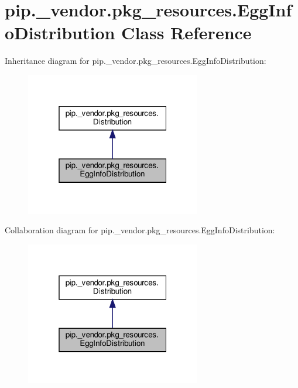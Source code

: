 \hypertarget{classpip_1_1__vendor_1_1pkg__resources_1_1EggInfoDistribution}{}\section{pip.\+\_\+vendor.\+pkg\+\_\+resources.\+Egg\+Info\+Distribution Class Reference}
\label{classpip_1_1__vendor_1_1pkg__resources_1_1EggInfoDistribution}


Inheritance diagram for pip.\+\_\+vendor.\+pkg\+\_\+resources.\+Egg\+Info\+Distribution\+:
\nopagebreak
\begin{figure}[H]
\begin{center}
\leavevmode
\includegraphics[width=217pt]{classpip_1_1__vendor_1_1pkg__resources_1_1EggInfoDistribution__inherit__graph}
\end{center}
\end{figure}


Collaboration diagram for pip.\+\_\+vendor.\+pkg\+\_\+resources.\+Egg\+Info\+Distribution\+:
\nopagebreak
\begin{figure}[H]
\begin{center}
\leavevmode
\includegraphics[width=217pt]{classpip_1_1__vendor_1_1pkg__resources_1_1EggInfoDistribution__coll__graph}
\end{center}
\end{figure}
